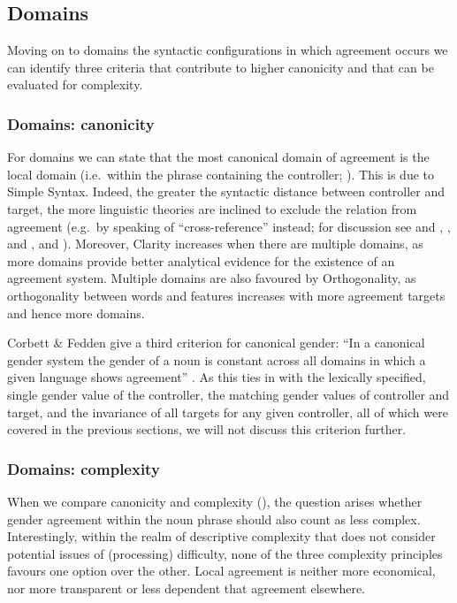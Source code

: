 \documentclass[output=collectionpaper]{langsci/langscibook}
\begin{document}
\subsection{Domains}
\label{sec:Audr:3.5}

Moving on to domains \textendash{} the syntactic configurations in which agreement occurs \textendash{} we can identify three criteria that contribute to higher canonicity and that can be evaluated for complexity.

\subsubsection{Domains: canonicity}

For domains we can state that the most canonical domain of agreement is the local domain (i.e.\ within the phrase containing the controller; \citealt[21]{Corbett2006}). This is due to Simple Syntax. Indeed, the greater the syntactic distance between controller and target, the more linguistic theories are inclined to exclude the relation from agreement (e.g.\ by speaking of ``cross-reference'' instead; for discussion see \citealt{Barlow1991} and \citealt[134--152]{Barlow1992}, \citealt{Corbett1991}, \citealt*{Corbett2001} and \citealt*{Corbett2006}, and \citealt{Siewierska1999}). Moreover, Clarity increases when there are multiple domains, as more domains provide better analytical evidence for the existence of an agreement system. Multiple domains are also favoured by Orthogonality, as orthogonality between words and features increases with more agreement targets and hence more domains.

Corbett \& Fedden give a third criterion for canonical gender: ``In a canonical gender system the gender of a noun is constant across all domains in which a given language shows agreement'' \citep[517]{Corbett2016}. As this ties in with the lexically specified, single gender value of the controller, the matching gender values of controller and target, and the invariance of all targets for any given controller, all of which were covered in the previous sections, we will not discuss this criterion further.

\subsubsection{Domains: complexity}

When we compare canonicity and complexity (), the question arises whether gender agreement within the noun phrase should also count as less complex. Interestingly, within the realm of descriptive complexity that does not consider potential issues of (processing) difficulty, none of the three complexity principles favours one option over the other. Local agreement is neither more economical, nor more transparent or less dependent that agreement elsewhere.
\end{document}
